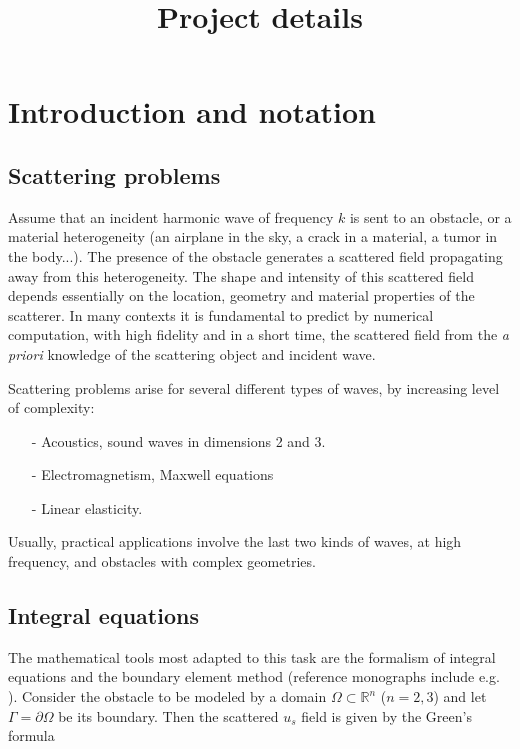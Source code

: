 \documentclass[]{article}
\title{Project details}
\begin{document}
\maketitle

\section{Introduction and notation}


\subsection*{Scattering problems}

Assume that an incident harmonic wave of frequency $k$ is sent to an obstacle, or a material heterogeneity (an airplane in the sky, a crack in a material, a tumor in the body...). The presence of the obstacle generates a scattered field propagating away from this heterogeneity. The shape and intensity of this scattered field depends essentially on the location, geometry and material properties of the scatterer. In many contexts it is fundamental to predict by numerical computation, with high fidelity and in a short time, the scattered field from the \textit{a priori} knowledge of the scattering object and incident wave. 

Scattering problems arise for several different types of waves, by increasing level of complexity:
\begin{itemize}
	\item[-] Acoustics, sound waves in dimensions 2 and 3.
	\item[-] Electromagnetism, Maxwell equations
	\item[-] Linear elasticity. 
\end{itemize} 
Usually, practical applications involve the last two kinds of waves, at high frequency, and obstacles with complex geometries.  

\subsection*{Integral equations}

The mathematical tools most adapted to this task are the formalism of integral equations and the boundary element method (reference monographs include e.g. \cite{mclean2000strongly,sauter2010boundary}). Consider the obstacle to be modeled by a domain $\Omega \subset \mathbb{R}^n$ ($n=2,3$) and let $\Gamma = \partial \Omega$ be its boundary. Then the scattered $u_s$ field is given by the Green's formula
\end{document}
